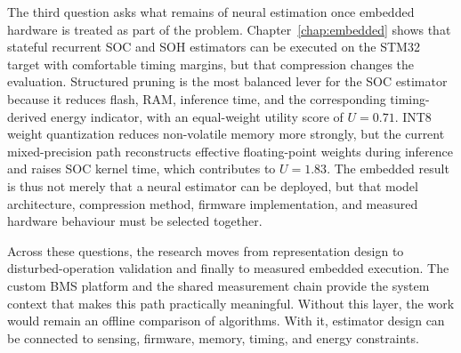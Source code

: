 \documentclass[
    a4paper,
    12pt,
    titlepage,
    bibliography=totoc,
    twoside=on,
    parskip=false,
    numbers=noenddot,
    cleardoublepage=empty,
    DIV=12,
    BCOR=12.0mm,
    headheight=36pt,
    headings=openright
]{scrreprt}
\begin{document}
The third question asks what remains of neural estimation once embedded hardware is treated as part of the problem. Chapter~\ref{chap:embedded} shows that stateful recurrent SOC and SOH estimators can be executed on the STM32 target with comfortable timing margins, but that compression changes the evaluation. Structured pruning is the most balanced lever for the SOC estimator because it reduces flash, RAM, inference time, and the corresponding timing-derived energy indicator, with an equal-weight utility score of $U=0.71$. INT8 weight quantization reduces non-volatile memory more strongly, but the current mixed-precision path reconstructs effective floating-point weights during inference and raises SOC kernel time, which contributes to $U=1.83$. The embedded result is thus not merely that a neural estimator can be deployed, but that model architecture, compression method, firmware implementation, and measured hardware behaviour must be selected together.

Across these questions, the research moves from representation design to disturbed-operation validation and finally to measured embedded execution. The custom BMS platform and the shared measurement chain provide the system context that makes this path practically meaningful. Without this layer, the work would remain an offline comparison of algorithms. With it, estimator design can be connected to sensing, firmware, memory, timing, and energy constraints.
\end{document}
